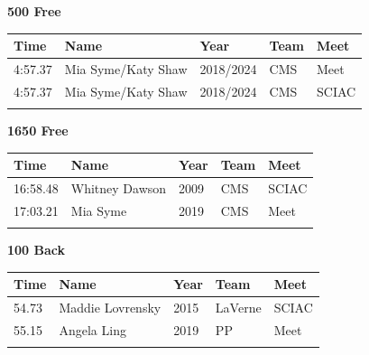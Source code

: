 \vspace{1.2em}
\noindent\begin{minipage}[t]{0.98\textwidth}
\centering
\textbf{\textcolor{teamprimary}{500 Free}}\par
\vspace{0.5em}
\centering
\small
\renewcommand{\arraystretch}{1.0}
\setlength{\tabcolsep}{4pt}
\begin{tabular}{@{}p{2.5cm}p{4.5cm}p{1.5cm}p{2.5cm}p{2.5cm}@{}}
\toprule
\textbf{Time} & \textbf{Name} & \textbf{Year} & \textbf{Team} & \textbf{Meet} \\
\midrule
4:57.37 & Mia Syme/Katy Shaw & 2018/2024 & CMS & Meet \\
4:57.37 & Mia Syme/Katy Shaw & 2018/2024 & CMS & SCIAC \\
\bottomrule
\vspace{0.5em}
\end{tabular}
\end{minipage}
\vspace{1.2em}
\noindent\begin{minipage}[t]{0.98\textwidth}
\centering
\textbf{\textcolor{teamprimary}{1650 Free}}\par
\vspace{0.5em}
\centering
\small
\renewcommand{\arraystretch}{1.0}
\setlength{\tabcolsep}{4pt}
\begin{tabular}{@{}p{2.5cm}p{4.5cm}p{1.5cm}p{2.5cm}p{2.5cm}@{}}
\toprule
\textbf{Time} & \textbf{Name} & \textbf{Year} & \textbf{Team} & \textbf{Meet} \\
\midrule
16:58.48 & Whitney Dawson & 2009 & CMS & SCIAC \\
17:03.21 & Mia Syme & 2019 & CMS & Meet \\
\bottomrule
\vspace{0.5em}
\end{tabular}
\end{minipage}
\vspace{1.2em}
\noindent\begin{minipage}[t]{0.98\textwidth}
\centering
\textbf{\textcolor{teamprimary}{100 Back}}\par
\vspace{0.5em}
\centering
\small
\renewcommand{\arraystretch}{1.0}
\setlength{\tabcolsep}{4pt}
\begin{tabular}{@{}p{2.5cm}p{4.5cm}p{1.5cm}p{2.5cm}p{2.5cm}@{}}
\toprule
\textbf{Time} & \textbf{Name} & \textbf{Year} & \textbf{Team} & \textbf{Meet} \\
\midrule
54.73 & Maddie Lovrensky & 2015 & LaVerne & SCIAC \\
55.15 & Angela Ling & 2019 & PP & Meet \\
\bottomrule
\vspace{0.5em}
\end{tabular}
\end{minipage}
